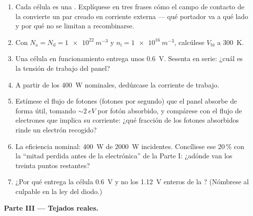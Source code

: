 \begin{problem}
\begin{enumerate}[resume]
  \item Cada célula es una . Explíquese en tres frases
        cómo el campo de contacto de la  convierte un par creado
        en corriente externa --- qué portador va a qué lado y por qué no
        se limitan a recombinarse.
  \item Con $N_{\text{a}} = N_{\text{d}} = \qty{1e22}{m^{-3}}$
        y $n_{\text{i}} = \qty{1e16}{m^{-3}}$, calcúlese
        $V_{\text{bi}}$ a \qty{300}{K}.
  \item Una célula en funcionamiento entrega unos \qty{0.6}{V}. Sesenta en
        serie: ¿cuál es la tensión de trabajo del panel?
  \item A partir de los \qty{400}{W} nominales, dedúzcase la corriente de
        trabajo.
  \item Estímese el flujo de fotones (fotones por segundo) que el panel
        absorbe de forma útil, tomando $\sim\qty{2}{eV}$ por fotón
        absorbido, y compárese con el flujo de electrones que implica su corriente:
        ¿qué fracción de los fotones absorbidos rinde un
        electrón recogido?
  \item La eficiencia nominal: \qty{400}{W} de
        \qty{2000}{W} incidentes. Concíliese ese 20\,\% con la
        ``mitad perdida antes de la electrónica'' de la Parte I: ¿adónde van los
        treinta puntos restantes?
  \item ¿Por qué entrega la célula \qty{0.6}{V} y no los
        \qty{1.12}{V} enteros de la ? (Nómbrese al culpable en la ley
        del diodo.)
\end{enumerate}

\medskip\noindent\textbf{Parte III --- Tejados reales.}


\end{problem}
